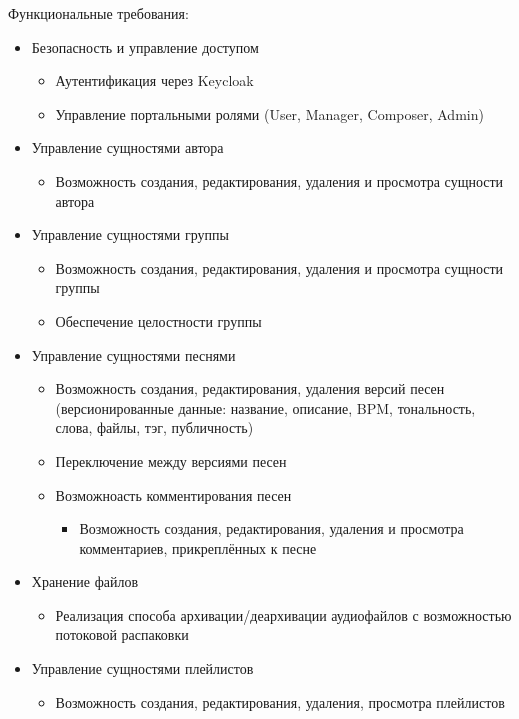 \documentclass[a4paper,14pt]{extarticle}
\begin{document}
Функциональные требования:
\begin{itemize}
\item Безопасность и управление доступом\\
    \begin{itemize}
    \item Аутентификация через Keycloak
    \item Управление портальными ролями (User, Manager, Composer, Admin)
    \end{itemize}
\item Управление сущностями автора
    \begin{itemize}
    \item Возможность создания, редактирования, удаления и просмотра сущности автора
    \end{itemize}
\item Управление сущностями группы
    \begin{itemize}
    \item Возможность создания, редактирования, удаления и просмотра сущности группы
    \item Обеспечение целостности группы
    \end{itemize}
\item Управление сущностями песнями
    \begin{itemize}
    \item Возможность создания, редактирования, удаления версий песен (версионированные данные: название, описание, BPM, тональность, слова, файлы, тэг, публичность)
    \item Переключение между версиями песен
    \item Возможноасть комментирования песен
        \begin{itemize}
        \item Возможность создания, редактирования, удаления и просмотра комментариев, прикреплённых к песне
        \end{itemize}
    \end{itemize}
\item Хранение файлов
    \begin{itemize}
        \item Реализация способа архивации/деархивации аудиофайлов с возможностью потоковой распаковки
    \end{itemize}
\item Управление сущностями плейлистов
    \begin{itemize}
        \item Возможность создания, редактирования, удаления, просмотра плейлистов

\end{itemize}
\end{itemize}
\end{document}

